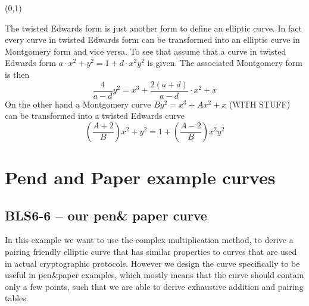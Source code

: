 (0,1)


The twisted Edwards form is just another form to define an elliptic curve. In fact every curve in twisted Edwards form can be transformed into an elliptic curve in Montgomery form and vice versa. To see that assume that a curve in twisted Edwards form $a\cdot x^2+y^2= 1+d\cdot x^2y^2$ is given. The associated Montgomery form is then
$$
\frac{4}{a-d} y^2 = x^3 + \frac{2(a+d)}{a-d}\cdot x^2 + x 
$$
On the other hand a Montgomery curve $By^{2}=x^{3}+Ax^{2}+x$ (WITH STUFF) can be transformed into a twisted Edwards curve 
$$
(\frac{A+2}{B})x^2+y^2= 1+(\frac{A-2}{B})x^2y^2
$$


\section{Pend and Paper example curves}
\subsection{BLS6-6 -- our pen\& paper curve}
In this example we want to use the complex multiplication method, to derive a pairing friendly elliptic curve that has similar properties to curves that are used in actual cryptographic protocols. However we design the curve specifically to be useful in pen\&{}paper examples, which mostly means that the curve should contain only a few points, such that we are able to derive exhaustive addition and pairing tables.

